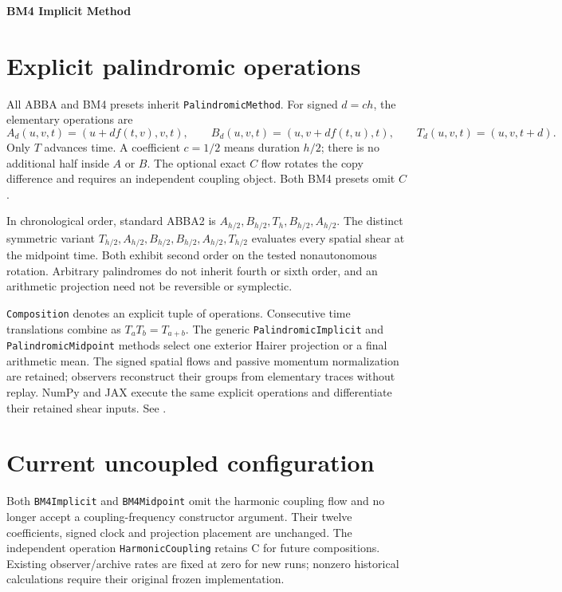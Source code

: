 \documentclass[11pt,a4paper]{article}
\begin{document}
\begin{center}
 {\LARGE\bfseries\color{gcblue}BM4 Implicit Method}\par
 \vspace{0.35em}{\large Physical state and one reduced Hairer projection per complete cycle}
\end{center}

\section*{Explicit palindromic operations}
All ABBA and BM4 presets inherit \texttt{PalindromicMethod}. For signed
$d=c h$, the elementary operations are
\[
 A_d(u,v,t)=(u+d f(t,v),v,t),\qquad
 B_d(u,v,t)=(u,v+d f(t,u),t),\qquad
 T_d(u,v,t)=(u,v,t+d).
\]
Only $T$ advances time. A coefficient $c=1/2$ means duration $h/2$;
there is no additional half inside $A$ or $B$. The optional exact $C$ flow
rotates the copy difference and requires an independent coupling object.
Both BM4 presets omit $C$.

In chronological order, standard ABBA2 is
$A_{h/2},B_{h/2},T_h,B_{h/2},A_{h/2}$.
The distinct symmetric variant
$T_{h/2},A_{h/2},B_{h/2},B_{h/2},A_{h/2},T_{h/2}$
evaluates every spatial shear at the midpoint time. Both exhibit second
order on the tested nonautonomous rotation. Arbitrary palindromes do not
inherit fourth or sixth order, and an arithmetic projection need not be
reversible or symplectic.

\texttt{Composition} denotes an explicit tuple of operations.
Consecutive time translations combine as $T_a T_b=T_{a+b}$.
The generic \texttt{PalindromicImplicit} and \texttt{PalindromicMidpoint}
methods select one exterior Hairer projection or a final arithmetic mean.
The signed spatial flows and passive momentum normalization are retained;
observers reconstruct their groups from elementary traces without replay. NumPy and JAX execute the same
explicit operations and differentiate their retained shear inputs.
See .


\section*{Current uncoupled configuration}
Both \texttt{BM4Implicit} and \texttt{BM4Midpoint} omit the harmonic
coupling flow and no longer accept a coupling-frequency constructor argument.
Their twelve coefficients, signed clock and projection placement are unchanged.
The independent operation \texttt{HarmonicCoupling} retains C for future
compositions. Existing observer/archive rates are fixed at zero for new runs;
nonzero historical calculations require their original frozen implementation.
\end{document}
